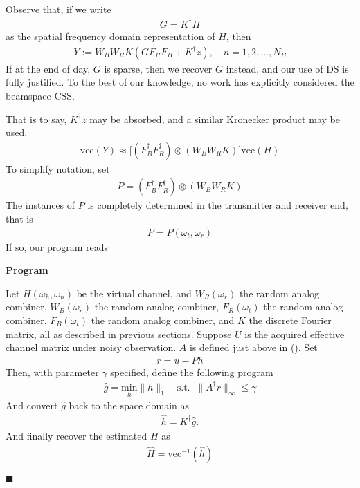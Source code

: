 \documentclass[12pt]{article}
\newcounter{NumResult}
\newcommand{\myCount}
{
   \stepcounter{NumResult}
   \textbf{\arabic{NumResult}}
}
\newcommand {\Result} [2]
{
   \bigskip
   \myCount \textbf{#1} \par
   {#2} \par
   \hfill \(\blacksquare\)
   \bigskip
}
\begin{document}
Observe that, if we write
\begin{gather}
G =K^\dagger H
\end{gather}
as the spatial frequency domain representation of \(H\), then
\begin{gather}
Y
:=W_B W_R K ( G F_R F_B +K^\dagger z ), \quad
n =1, 2, \dotsc, N_B
\end{gather}
If at the end of day, \(G\) is sparse, then we recover \(G\) instead, and our use of DS is fully justified.
To the best of our knowledge, no work has explicitly considered the beamspace CSS.

That is to say, \(K^\dagger z\) may be absorbed, and a similar Kronecker product may be used.
\begin{gather}
\mathrm{vec}(Y)
\approx \big[ (F_B^\dagger F_R^\dagger) \otimes (W_B W_R K) \big] \mathrm{vec}(H)
\end{gather}
To simplify notation, set 
\begin{gather}
P =(F_B^\dagger F_R^\dagger) \otimes (W_B W_R K)
\end{gather}
The instances of \(P\) is completely determined in the transmitter and receiver end, that is
\begin{gather}
P =P(\omega_t, \omega_r)
\end{gather}
If so, our program reads

\Result
{Program}
{
Let \(H(\omega_h, \omega_n)\) be the virtual channel, and \(W_R(\omega_r)\) the random analog combiner, \(W_B(\omega_r)\) the random analog combiner, \(F_R(\omega_t)\) the random analog combiner, \(F_B(\omega_t)\) the random analog combiner, and \(K\) the discrete Fourier matrix, all as described in previous sections.
Suppose \(U\) is the acquired effective channel matrix under noisy observation.
\(A\) is defined just above in ().
Set
\begin{gather}
r =u -P h
\end{gather}
Then, with parameter \(\gamma\) specified, define the following program
\begin{gather}
\hat{g}
=\underset {{h}} {\mathrm{min}} \|h\|_1 \quad
\mathrm{s.t.}\;\; \|A^\dagger r\|_\infty \leq \gamma
\end{gather}
And convert \(\hat{g}\) back to the space domain as
\begin{gather}
\hat{h}
=K^\dagger \hat{g}.
\end{gather}
And finally recover the estimated \(H\) as
\begin{gather}
\hat{H} =\mathrm{vec}^{-1} (\hat{h})
\end{gather}
}
\end{document}
